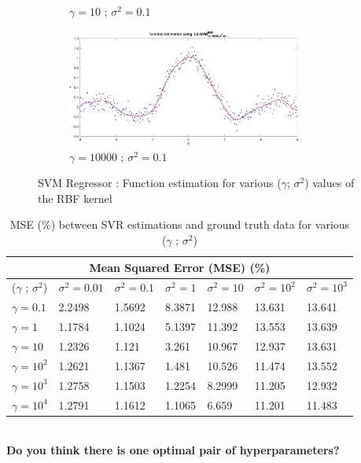 \begin{figure}[ht]
\begin{subfigure}[b]{0.35\textwidth}
		\caption{$\gamma = 10$ ; $\sigma^2 = 0.1$ }\label{fig:Ex_1_2_1_gam(1)_sig(0.1)}
	\end{subfigure}%
	\begin{subfigure}[b]{0.35\textwidth}
		\centering
		\captionsetup{width=0.8\linewidth}
		\includegraphics[width = 0.85\textwidth]{Exercise2/Report/Ex_1_2_1_gam(10000)_sig(0.1)}
		\caption{$\gamma = 10000$ ; $\sigma^2 = 0.1$}\label{fig:Ex_1_2_1_gam(10000)_sig(0.1)}
	\end{subfigure}
	\caption{SVM Regressor : Function estimation for various ($\gamma$; $\sigma^2$) values of the RBF kernel}
	\label{fig:sinc_regress}
\end{figure}
\begin{table}[!htpb]
	\centering
	\begin{tabular}{ ||p{1.8cm}||p{1.8cm}|p{1.8cm}|p{1.8cm}|p{1.8cm}|p{1.8cm}|p{1.8cm}|}
		\hline
		\multicolumn{7}{|c|}{Mean Squared Error (MSE) (\%)} \\ \hline\hline
		\cellcolor{blue!25}($\gamma$ ; $\sigma^2$) &\cellcolor{blue!25}$\sigma^2 = 0.01$ & \cellcolor{blue!25}$\sigma^2 = 0.1$ &\cellcolor{blue!25}$\sigma^2 = 1$ & \cellcolor{blue!25}$\sigma^2 = 10$ &\cellcolor{blue!25}$\sigma^2 = 10^2$ &\cellcolor{blue!25}$\sigma^2 = 10^3$ \\ \hline \hline
		\cellcolor{blue!25}$\gamma = 0.1$ &2.2498&1.5692&8.3871&12.988&13.631&13.641 \\ \hline
		\cellcolor{blue!25}$\gamma = 1$ &1.1784&1.1024&5.1397&11.392&13.553&13.639 \\ \hline
		\cellcolor{blue!25}$\gamma = 10$ &1.2326&1.121&3.261&10.967&12.937&13.631 \\ \hline
		\cellcolor{blue!25}$\gamma = 10^2$ &1.2621&1.1367&1.481&10.526&11.474&13.552 \\ \hline
		\cellcolor{blue!25}$\gamma = 10^3$ &1.2758&1.1503&1.2254&8.2999&11.205&12.932 \\ \hline
		\cellcolor{blue!25}$\gamma = 10^4$ &1.2791&1.1612&1.1065&6.659&11.201&11.483 \\ \hline
	\end{tabular}
	\caption{MSE (\%) between SVR estimations and ground truth data for various ($\gamma$ ; $\sigma^2$)}
	\label{table:9}
\end{table}\\
\textbf{Do you think there is one optimal pair of hyperparameters? }


